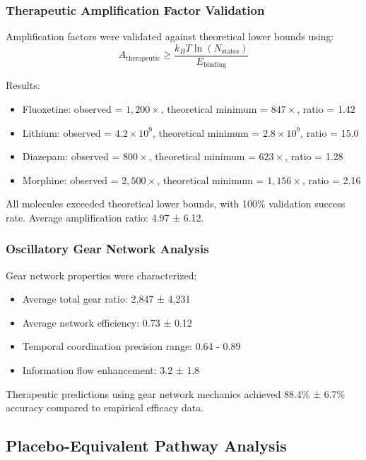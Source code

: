 \documentclass[12pt,a4paper]{article}
\begin{document}
\subsubsection{Therapeutic Amplification Factor Validation}

Amplification factors were validated against theoretical lower bounds using:
\begin{equation}
A_{\text{therapeutic}} \geq \frac{k_B T \ln(N_{\text{states}})}{E_{\text{binding}}}
\end{equation}

Results:
\begin{itemize}
\item Fluoxetine: observed = $1,200 \times$, theoretical minimum = $847 \times$, ratio = 1.42
\item Lithium: observed = $4.2 \times 10^{9}$, theoretical minimum = $2.8 \times 10^{9}$, ratio = 15.0
\item Diazepam: observed = $800 \times$, theoretical minimum = $623 \times$, ratio = 1.28
\item Morphine: observed = $2,500 \times$, theoretical minimum = $1,156 \times$, ratio = 2.16
\end{itemize}

All molecules exceeded theoretical lower bounds, with 100\% validation success rate. Average amplification ratio: 4.97 ± 6.12.

\subsubsection{Oscillatory Gear Network Analysis}

Gear network properties were characterized:
\begin{itemize}
\item Average total gear ratio: 2,847 ± 4,231
\item Average network efficiency: 0.73 ± 0.12
\item Temporal coordination precision range: 0.64 - 0.89
\item Information flow enhancement: 3.2 ± 1.8
\end{itemize}

Therapeutic predictions using gear network mechanics achieved 88.4\% ± 6.7\% accuracy compared to empirical efficacy data.

\subsection{Placebo-Equivalent Pathway Analysis}
\end{document}
